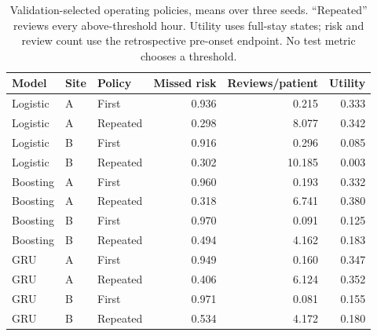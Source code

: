 \begin{table}[t]
\centering\small
\caption{Validation-selected operating policies, means over three seeds. ``Repeated'' reviews every above-threshold hour. Utility uses full-stay states; risk and review count use the retrospective pre-onset endpoint. No test metric chooses a threshold.}

\begin{tabular}{lllrrr}\toprule
Model & Site & Policy & Missed risk & Reviews/patient & Utility\\\midrule
Logistic & A & First & 0.936 & 0.215 & 0.333 \\
Logistic & A & Repeated & 0.298 & 8.077 & 0.342 \\
Logistic & B & First & 0.916 & 0.296 & 0.085 \\
Logistic & B & Repeated & 0.302 & 10.185 & 0.003 \\
Boosting & A & First & 0.960 & 0.193 & 0.332 \\
Boosting & A & Repeated & 0.318 & 6.741 & 0.380 \\
Boosting & B & First & 0.970 & 0.091 & 0.125 \\
Boosting & B & Repeated & 0.494 & 4.162 & 0.183 \\
GRU & A & First & 0.949 & 0.160 & 0.347 \\
GRU & A & Repeated & 0.406 & 6.124 & 0.352 \\
GRU & B & First & 0.971 & 0.081 & 0.155 \\
GRU & B & Repeated & 0.534 & 4.172 & 0.180 \\
\bottomrule\end{tabular}\end{table}
